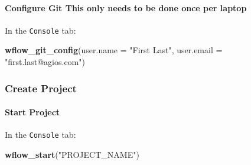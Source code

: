 \documentclass[openany]{article}
\newenvironment{Shaded}{\begin{snugshade}}{\end{snugshade}}
\newcommand{\DataTypeTok}[1]{\textcolor[rgb]{0.13,0.29,0.53}{#1}}
\newcommand{\KeywordTok}[1]{\textcolor[rgb]{0.13,0.29,0.53}{\textbf{#1}}}
\newcommand{\NormalTok}[1]{#1}
\newcommand{\StringTok}[1]{\textcolor[rgb]{0.31,0.60,0.02}{#1}}
\let\oldparagraph\paragraph
\renewcommand{\paragraph}[1]{\oldparagraph{#1}\mbox{}}
\begin{document}
\hypertarget{configure-git-this-only-needs-to-be-done-once-per-laptop}{%
\paragraph{\texorpdfstring{Configure Git\emph{
}This only needs to be done once per laptop}{Configure Git This only needs to be done once per laptop}}\label{configure-git-this-only-needs-to-be-done-once-per-laptop}}

In the \texttt{Console} tab:

\begin{Shaded}
\begin{Highlighting}[]
\KeywordTok{wflow_git_config}\NormalTok{(}\DataTypeTok{user.name =} \StringTok{"First Last"}\NormalTok{, }\DataTypeTok{user.email =} \StringTok{"first.last@agios.com"}\NormalTok{)}
\end{Highlighting}
\end{Shaded}

\hypertarget{create-project}{%
\subsubsection{Create Project}\label{create-project}}

\hypertarget{start-project}{%
\paragraph{Start Project}\label{start-project}}

In the \texttt{Console} tab:

\begin{Shaded}
\begin{Highlighting}[]
\KeywordTok{wflow_start}\NormalTok{(}\StringTok{"PROJECT_NAME"}\NormalTok{)}
\end{Highlighting}
\end{Shaded}
\end{document}
